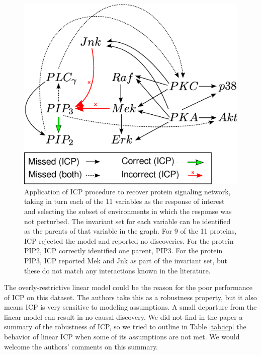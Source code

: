 \documentclass{article}
\begin{document}
\begin{figure}[t]
\centering
\includegraphics[scale = 0.3]{drawing2legend.eps}
\caption{Application of ICP procedure to recover protein signaling network,
taking in turn each of the 11 variables as the response of interest
and selecting the subset of environments in which the response was not
perturbed.  The invariant set for each variable can be identified as
the parents of that variable in the graph.  For 9 of the 11 proteins,
ICP rejected the model and reported no discoveries.  For the protein
PIP2, ICP correctly identified one parent, PIP3.  For the protein
PIP3, ICP reported Mek and Jnk as part of the invariant set, but these
do not match any interactions known in the literature.}
\label{fig:sachs}
\end{figure}

The overly-restrictive linear model could be the reason for the poor
performance of ICP on this dataset. The authors take this as a
robustness property, but it also means ICP is very sensitive to
modeling assumptions. A small departure from the linear
model can result in no causal discovery. We did not find in the paper a
summary of the robustness of ICP, so we tried to outline in
Table \ref{tab:icp} the behavior of linear ICP when some of its
assumptions are not met. We would welcome the authors' comments on
this summary.
\end{document}
